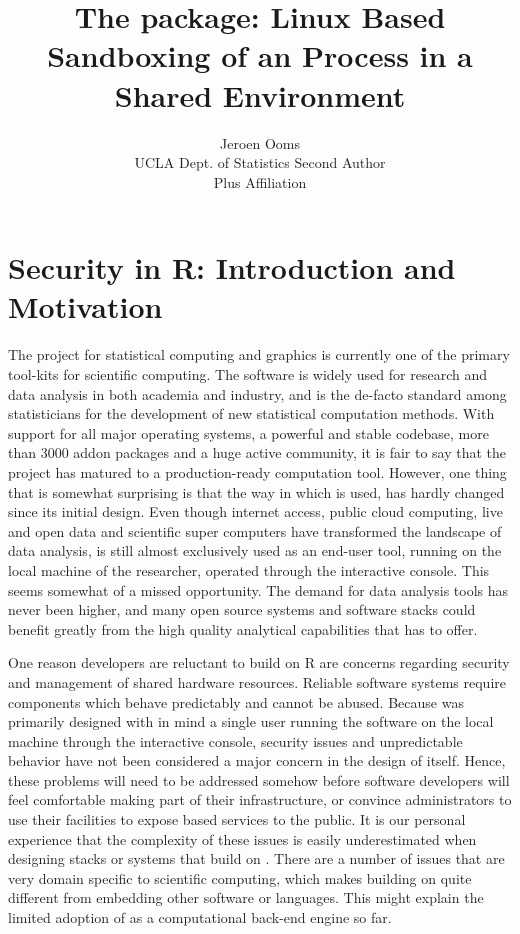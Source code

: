\documentclass[article]{jss}
\author{Jeroen Ooms\\UCLA Dept. of Statistics \And
        Second Author\\Plus Affiliation}
\title{The \pkg{RAppArmor} package: Linux Based Sandboxing of an \proglang{R}
Process in a Shared Environment}
\begin{document}
\section{Security in R: Introduction and Motivation}

The  project for statistical computing and graphics
\citep{R-project} is currently one of the primary tool-kits for scientific
computing. The software is widely used for research and data analysis in both
academia and industry, and is the de-facto standard among statisticians for the
development of new statistical computation methods. With support for all major
operating systems, a powerful and stable codebase, more than 3000 addon
packages and a huge active community, it is fair to say that the project has
matured to a production-ready computation tool. However, one thing that is
somewhat surprising is that the way in which  is used, has hardly
changed since its initial design. Even though internet access, public
cloud computing, live and open data and scientific super computers have transformed
the landscape of data analysis,  is still almost exclusively used
as an end-user tool, running on the local machine of the researcher, operated
through the interactive console. This seems somewhat of a missed opportunity.
The demand for data analysis tools has never been higher, and many open source
systems and software stacks could benefit greatly from the high quality
analytical capabilities that  has to offer.

One reason developers are reluctant to build on R are concerns regarding
security and management of shared hardware resources. Reliable software systems
require components which behave predictably and cannot be abused. Because
 was primarily designed with in mind a single user running the
software on the local machine through the interactive console, security issues
and unpredictable behavior have not been considered a major concern in the
design of  itself. Hence, these problems will need to be addressed
somehow before software developers will feel comfortable making 
part of their infrastructure, or convince administrators to use their
facilities to expose  based services to the public. It is our
personal experience that the complexity of these issues is easily
underestimated when designing stacks or systems that build on .
There are a number of issues that are very domain specific to scientific
computing, which makes building on  quite different from embedding
other software or languages. This might explain the limited adoption of
 as a computational back-end engine so far.
\end{document}

